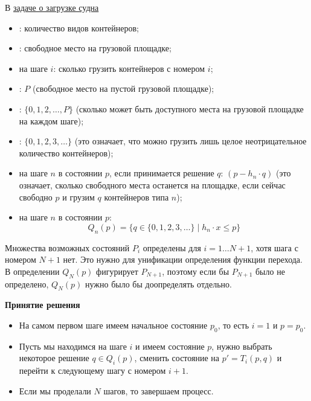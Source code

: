 \begin{note}
	В \hyperref[pr:loading_vessel]{задаче о загрузке судна}
	
	\begin{itemize}[nosep]
		\item {}: количество видов контейнеров;
		
		\item {}: свободное место на грузовой площадке;
		
		\item {} на шаге $i$: сколько грузить контейнеров с номером $i$;
		
		\item {}: $P$ (свободное место на пустой грузовой площадке);
		
		\item {}: $\{0, 1, 2, \dots, P\}$ (сколько может быть доступного места на грузовой площадке на каждом шаге);
		
		\item {}: $\{0, 1, 2, 3, \dots\}$ (это означает, что можно грузить лишь целое неотрицательное количество контейнеров);
		
		\item {} на шаге $n$ в состоянии $p$, если принимается решение $q$: $(p - h_n \cdot q)$ (это означает, сколько свободного места останется на площадке, если сейчас свободно $p$ и грузим $q$ контейнеров типа $n$);
		
		\item {} на шаге $n$ в состоянии $p$: 
		\[
		Q_n(p) = \big\{q \in \{0, 1, 2, 3, \dots\} \; \big| \; h_n \cdot x \le p\big\}
		\]
	\end{itemize}
\end{note}

\begin{note}
	Множества возможных состояний $P_i$ определены для $i = 1 \dots N+1$, хотя шага с номером $N+1$ нет. Это нужно для унификации определения функции перехода. В определении $Q_N(p)$ фигурирует $P_{N+1}$, поэтому если бы $P_{N+1}$ было не определено, $Q_N(p)$ нужно было бы доопределять отдельно.
\end{note}

\textbf{Принятие решения}

\begin{itemize}[nosep]
	\item На самом первом шаге имеем начальное состояние $p_0$, то есть $i=1$ и $p = p_0$.
	
	\item Пусть мы находимся на шаге $i$ и имеем состояние $p$, нужно выбрать некоторое решение $q \in Q_i(p)$, сменить состояние на $p' = T_i(p, q)$ и перейти к следующему шагу с номером $i+1$.
	
	\item Если мы проделали $N$ шагов, то завершаем процесс.
\end{itemize}

